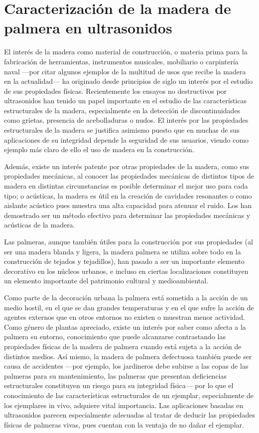 \chapter{Caracterización de la madera de palmera en ultrasonidos}

El interés de la madera como material de construcción, o materia prima para
la fabricación de herramientas, instrumentos musicales, mobiliario o
carpintería naval ---por citar algunos ejemplos de la multitud de usos que
recibe la madera en la actualidad--- ha originado desde principios de siglo
un interés por el estudio de sus propiedades físicas. Recientemente los
ensayos no destructivos por ultrasonidos han tenido un papel importante en
el estudio de las características estructurales de la madera, especialmente
en la detección de discontinuidades como grietas, presencia de
acebolladuras o nudos. El interés por las propiedades estructurales de la
madera se justifica asimismo puesto que en muchas de sus aplicaciones de su
integridad depende la seguridad de sus usuarios, viendo como ejemplo más
claro de ello el uso de madera en la construcción.

Además, existe un interés patente por otras propiedades de la madera, como
sus propiedades mecánicas, al conocer las propiedades mecánicas de
distintos tipos de madera en distintas circunstancias es posible determinar
el mejor uso para cada tipo; o acústicas, la madera es útil en la creación
de cavidades resonantes o como aislante acústico pues muestra una alta
capacidad para atenuar el ruido. Los  han demostrado ser un
método efectivo para determinar las propiedades mecánicas y acústicas de la
madera.

Las palmeras, aunque también útiles para la construcción por sus
propiedades (al ser una madera blanda y ligera, la madera palmera se
utiliza sobre todo en la construcción de tejados y tejadillos), han pasado
a ser un importante elemento decorativo en los núcleos urbanos, e incluso
en ciertas localizaciones constituyen un elemento importante del patrimonio
cultural y medioambiental.

Como parte de la decoración urbana la palmera está sometida a la acción de
un medio hostil, en el que se dan grandes temperaturas y en el que sufre la
acción de agentes externos que en otros entornos no existen o muestran
menor actividad. Como género de plantas apreciado, existe un interés por
saber como afecta a la palmera su entorno, conocimiento que puede
alcanzarse contrastando las propiedades físicas de la madera de palmera
cuando está sujeta a la acción de distintos medios. Así mismo, la madera de
palmera defectuosa también puede ser causa de accidentes ---por ejemplo,
los jardineros debe subirse a las copas de las palmeras para su
mantenimiento, las palmeras que presentan deficiencias estructurales
constituyen un riesgo para su integridad física--- por lo que el
conocimiento de las características estructurales de un ejemplar,
especialmente de los ejemplares in vivo, adquiere vital importancia. Las
aplicaciones basadas en ultrasonidos parecen especialmente adecuadas al
tratar de deducir las propiedades físicas de palmeras vivas, pues cuentan
con la ventaja de no dañar el ejemplar.


